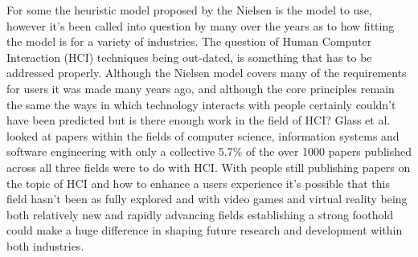 \documentclass{scrartcl}
\begin{document}
For some the heuristic model proposed by the Nielsen \cite{nielsen1990heuristic} is the model to use, however it's been called into question by many over the years as to how fitting the model is for a variety of industries. \cite{pinelle2008heuristic, pinelle2009usability, sutcliffe2004heuristic, john1998traditional} The question of Human Computer Interaction (HCI) techniques being out-dated, is something that has to be addressed properly. Although the Nielsen model covers many of the requirements for users it was made many years ago, and although the core principles remain the same the ways in which technology interacts with people certainly couldn't have been predicted but is there enough work in the field of HCI? Glass et al. \cite{glass2004analysis} looked at papers within the fields of computer science, information systems and software engineering with only a collective 5.7\% of the over 1000 papers published across all three fields were to do with HCI. With people still publishing papers on the topic of HCI and how to enhance a users experience it's possible that this field hasn't been as fully explored and with video games and virtual reality being both relatively new and rapidly advancing fields establishing a strong foothold could make a huge difference in shaping future research and development within both industries.



\end{document}
